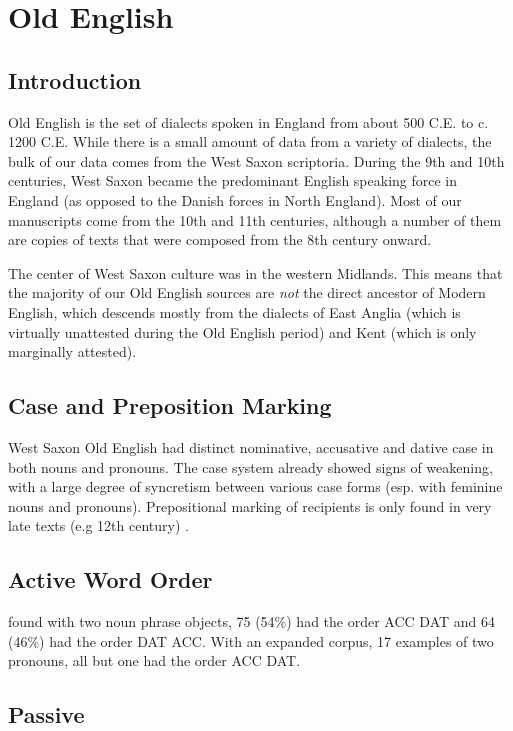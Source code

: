 \section{Old English}
\subsection{Introduction}
Old English is the set of dialects spoken in England from about 500 C.E. to c. 1200 C.E. While there is a small amount of data from a variety of dialects, the bulk of our data comes from the West Saxon scriptoria. During the 9th and 10th centuries, West Saxon became the predominant English speaking force in England (as opposed to the Danish forces in North England). Most of our manuscripts come from the 10th and 11th centuries, although a number of them are copies of texts that were composed from the 8th century onward.

The center of West Saxon culture was in the western Midlands. This means that the majority of our Old English sources are \emph{not} the direct ancestor of Modern English, which descends mostly from the dialects of East Anglia (which is virtually unattested during the Old English period) and Kent (which is only marginally attested). 
\subsection{Case and Preposition Marking}
West Saxon Old English had distinct nominative, accusative and dative case in both nouns and pronouns. The case system already showed signs of weakening, with a large degree of syncretism between various case forms (esp. with feminine nouns and pronouns). Prepositional marking of recipients is only found in very late texts (e.g 12th century) \citep{McFadden.2002}.
\subsection{Active Word Order}
\cite[48-49]{Allen.1999} found with two noun phrase objects, 75 (54\%) had the order ACC DAT and 64 (46\%) had the order DAT ACC. With an expanded corpus, 17 examples of two pronouns, all but one had the order ACC DAT.

\subsection{Passive}
